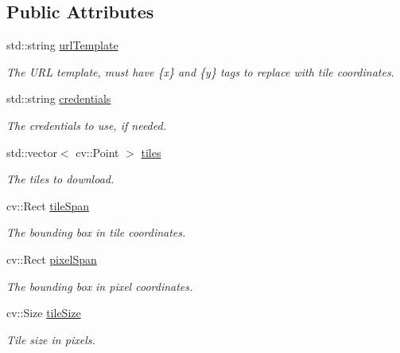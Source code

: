\subsection*{Public Attributes}
\begin{DoxyCompactItemize}
\item 
std\+::string \hyperlink{structdg_1_1deepcore_1_1imagery_1_1_tile_downloader_ac8fb59cb29683585c7f868e6d8a70f6f}{url\+Template}
\begin{DoxyCompactList}\small\item\em The U\+RL template, must have \{x\} and \{y\} tags to replace with tile coordinates. \end{DoxyCompactList}\item 
std\+::string \hyperlink{structdg_1_1deepcore_1_1imagery_1_1_tile_downloader_a129f882a4aecc3f2fee375d62c99fef8}{credentials}
\begin{DoxyCompactList}\small\item\em The credentials to use, if needed. \end{DoxyCompactList}\item 
std\+::vector$<$ cv\+::\+Point $>$ \hyperlink{structdg_1_1deepcore_1_1imagery_1_1_tile_downloader_a213ae477313131ed92dab6df96354a94}{tiles}
\begin{DoxyCompactList}\small\item\em The tiles to download. \end{DoxyCompactList}\item 
cv\+::\+Rect \hyperlink{structdg_1_1deepcore_1_1imagery_1_1_tile_downloader_a09a8dbd06565015c875284ab6618e7d7}{tile\+Span}
\begin{DoxyCompactList}\small\item\em The bounding box in tile coordinates. \end{DoxyCompactList}\item 
cv\+::\+Rect \hyperlink{structdg_1_1deepcore_1_1imagery_1_1_tile_downloader_a34151548b03536061442aefb2decd4f2}{pixel\+Span}
\begin{DoxyCompactList}\small\item\em The bounding box in pixel coordinates. \end{DoxyCompactList}\item 
cv\+::\+Size \hyperlink{structdg_1_1deepcore_1_1imagery_1_1_tile_downloader_a393833b2aa8a3a134ca6aac438802ece}{tile\+Size}
\begin{DoxyCompactList}\small\item\em Tile size in pixels. \end{DoxyCompactList}\item 

\end{DoxyCompactItemize}
